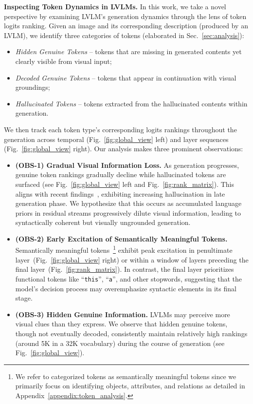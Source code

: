\documentclass{article}
\theoremstyle{plain}
\theoremstyle{definition}
\theoremstyle{remark}
\begin{document}
\textbf{Inspecting Token Dynamics in LVLMs.} 
In this work, we take a novel perspective by examining LVLM's generation dynamics through the lens of token logits ranking. Given an image and its corresponding description (produced by an LVLM), we identify three categories of tokens (elaborated in Sec.~\ref{sec:analysis}): 
\begin{itemize}[nosep,leftmargin=16pt]
    \item \emph{Hidden Genuine Tokens} -- tokens that are missing in generated contents yet clearly visible from visual input; 
    \item \emph{Decoded Genuine Tokens} -- tokens that appear in continuation with visual groundings;
    \item \emph{Hallucinated Tokens} -- tokens extracted from the hallucinated contents within generation.
\end{itemize}
We then track each token type's corresponding logits rankings throughout the generation across temporal (Fig.~\ref{fig:global_view} left) and layer sequences (Fig.~\ref{fig:global_view} right). Our analysis makes three prominent observations: 
\begin{itemize}[nosep,leftmargin=16pt]
    \item \textbf{(OBS-1) Gradual Visual Information Loss.} As generation progresses, genuine token rankings gradually decline while hallucinated tokens are surfaced (see Fig.~\ref{fig:global_view} left and Fig.~\ref{fig:rank_matrix}). This aligns with recent findings~\cite{yue2024less, favero2024multi}, exhibiting increasing hallucination in late generation phase. We hypothesize that this occurs as accumulated language priors in residual streams progressively dilute visual information, leading to syntactically coherent but visually ungrounded generation.
    \item \textbf{(OBS-2) Early Excitation of Semantically Meaningful Tokens.} Semantically meaningful tokens~\footnote{We refer to categorized tokens as semantically meaningful tokens since we primarily focus on identifying objects, attributes, and relations as detailed in Appendix~\ref{appendix:token_analysis}.} exhibit peak excitation in penultimate layer~(Fig.~\ref{fig:global_view} right) or within a window of layers preceding the final layer~(Fig.~\ref{fig:rank_matrix}). In contrast, the final layer prioritizes functional tokens like ``\texttt{this}'', ``\texttt{a}'', and other stopwords, suggesting that the model's decision process may overemphasize syntactic elements in its final stage.
    \item \textbf{(OBS-3) Hidden Genuine Information.} LVLMs may perceive more visual clues than they express. We observe that hidden genuine tokens, though not eventually decoded, consistently maintain relatively high rankings (around 5K in a 32K vocabulary) during the course of generation (see Fig.~\ref{fig:global_view}).
\end{itemize}
\end{document}

